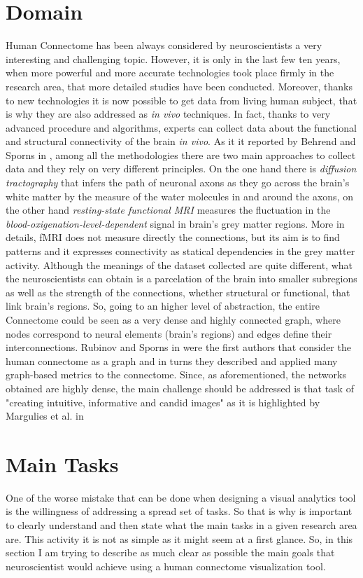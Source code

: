 \documentclass{article}
\begin{document}
\begin{multicols}{2}
\section{Domain}
Human Connectome has been always considered by neuroscientists a very interesting and challenging topic. However, it is only in the last few ten years, when more powerful and more accurate technologies took place firmly in the research area, that more detailed studies have been conducted. Moreover, thanks to new technologies it is now possible to get data from living human subject, that is why they are also addressed as \textit{in vivo} techniques. In fact, thanks to very advanced procedure and algorithms, experts can collect data about the functional and structural connectivity of the brain \textit{in vivo}. As it it reported by Behrend and Sporns in \cite{humanConnectomics}, among all the methodologies there are two main approaches to collect data and they rely on very different principles. On the one hand there is \textit{diffusion tractography} that infers the path of neuronal axons as they go across the brain's white matter by the measure of the water molecules in and around the axons, on the other hand \textit{resting-state functional MRI} measures the fluctuation in the \textit{blood-oxigenation-level-dependent} signal in brain's grey matter regions. More in details, fMRI does not measure directly the connections, but its aim is to find patterns and it expresses connectivity as statical dependencies in the grey matter activity. Although the meanings of the dataset collected are quite different, what the neuroscientists can obtain is a parcelation of the brain into smaller subregions as well as the strength of the connections, whether structural or functional, that link brain's regions. So, going to an higher level of abstraction, the entire Connectome could be seen as a very dense and highly connected graph, where nodes correspond to neural elements (brain's regions) and edges define their interconnections. Rubinov and Sporns in \cite{complexNetworkMeasures} were the first authors that consider the human connectome as a graph and in turns they described and applied many graph-based metrics to the connectome. Since, as aforementioned, the networks obtained are highly dense, the main challenge should be addressed is that task of "creating intuitive, informative and candid images" as it is highlighted by Margulies et al. in \cite{visualizingHumanConnectome}

\section{Main Tasks}
One of the worse mistake that can be done when designing a visual analytics tool is the willingness of addressing a spread set of tasks. So that is why is important to clearly understand and then state what the main tasks in a given research area are. This activity it is not as simple as it might seem at a first glance. So, in this section I am trying to describe as much clear as possible the main goals that neuroscientist would achieve using a human connectome visualization tool.\\


\end{multicols}
\end{document}
